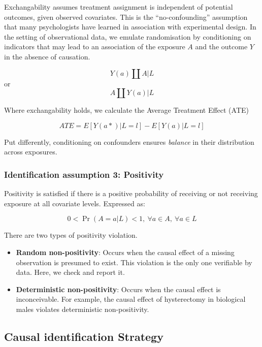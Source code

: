 \documentclass[
  singlecolumn]{report}
\begin{document}
Exchangability assumes treatment assignment is independent of potential
outcomes, given observed covariates. This is the ``no-confounding''
assumption that many psychologists have learned in association with
experimental design. In the setting of observational data, we emulate
randomisation by conditioning on indicators that may lead to an
association of the exposure \(A\) and the outcome \(Y\) in the absence
of causation.

\[Y(a)\coprod  A|L\] or \[A \coprod  Y(a)|L\]

Where exchangability holds, we calculate the Average Treatment Effect
(ATE)

\[
ATE = E[Y(a*)|L = l] - E[Y(a)|L = l] 
\]

Put differently, conditioning on confounders ensures \emph{balance} in
their distribution across exposures.

\hypertarget{identification-assumption-3-positivity}{%
\subsubsection{Identification assumption 3:
Positivity}\label{identification-assumption-3-positivity}}

Positivity is satisfied if there is a positive probability of receiving
or not receiving exposure at all covariate levels. Expressed as:

\begin{equation}
0 < \Pr(A=a|L)<1, ~ \forall a \in A, ~ \forall a \in L
\end{equation}

There are two types of positivity violation.

\begin{itemize}
\item
  \textbf{Random non-positivity}: Occurs when the causal effect of a
  missing observation is presumed to exist. This violation is the only
  one verifiable by data. Here, we check and report it.
\item
  \textbf{Deterministic non-positivity}: Occurs when the causal effect
  is inconceivable. For example, the causal effect of hysterectomy in
  biological males violates deterministic non-positivity.
\end{itemize}

\hypertarget{causal-identification-strategy}{%
\subsection{Causal identification
Strategy}\label{causal-identification-strategy}}
\end{document}
